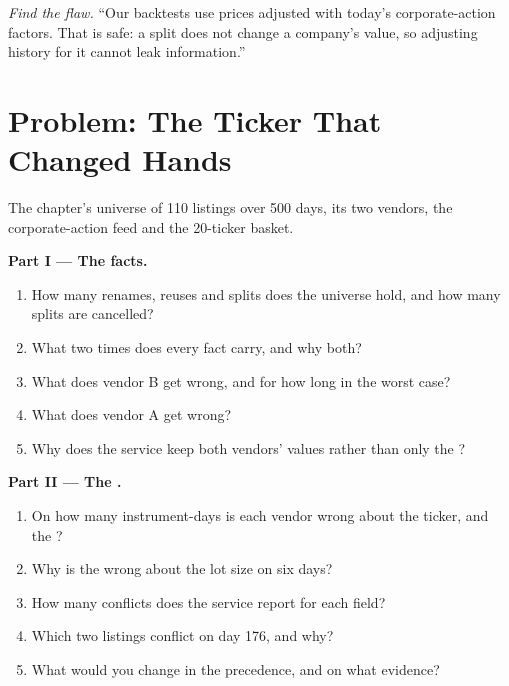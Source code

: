 \begin{exercise}[$\star\star\star$]\label{exo:pl:reference-data-and-symbology-services:8}
\emph{Find the flaw.} ``Our backtests use prices adjusted with today's corporate-action factors. That is safe: a split does not
change a company's value, so adjusting history for it cannot leak information.''
\end{exercise}

\section{Problem: The Ticker That Changed Hands}

\begin{problem}\label{pb:pl:reference-data-and-symbology-services:1}
The chapter's universe of 110 listings over 500 days, its two vendors, the corporate-action feed and the 20-ticker basket.

\medskip\noindent\textbf{Part I --- The facts.}
\begin{enumerate}
\item How many renames, reuses and splits does the universe hold, and how many splits are cancelled?
\item What two times does every fact carry, and why both?
\item What does vendor B get wrong, and for how long in the worst case?
\item What does vendor A get wrong?
\item Why does the service keep both vendors' values rather than only the ?
\end{enumerate}

\medskip\noindent\textbf{Part II --- The .}
\begin{enumerate}[resume]
\item On how many instrument-days is each vendor wrong about the ticker, and the ?
\item Why is the  wrong about the lot size on six days?
\item How many conflicts does the service report for each field?
\item Which two listings conflict on day 176, and why?
\item What would you change in the precedence, and on what evidence?
\end{enumerate}


\end{problem}
